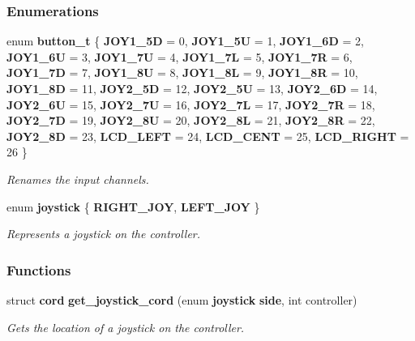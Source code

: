 \subsubsection*{Enumerations}
\begin{DoxyCompactItemize}
\item 
enum \textbf{ button\+\_\+t} \{ \newline
\textbf{ J\+O\+Y1\+\_\+5D} = 0, 
\textbf{ J\+O\+Y1\+\_\+5U} = 1, 
\textbf{ J\+O\+Y1\+\_\+6D} = 2, 
\textbf{ J\+O\+Y1\+\_\+6U} = 3, 
\newline
\textbf{ J\+O\+Y1\+\_\+7U} = 4, 
\textbf{ J\+O\+Y1\+\_\+7L} = 5, 
\textbf{ J\+O\+Y1\+\_\+7R} = 6, 
\textbf{ J\+O\+Y1\+\_\+7D} = 7, 
\newline
\textbf{ J\+O\+Y1\+\_\+8U} = 8, 
\textbf{ J\+O\+Y1\+\_\+8L} = 9, 
\textbf{ J\+O\+Y1\+\_\+8R} = 10, 
\textbf{ J\+O\+Y1\+\_\+8D} = 11, 
\newline
\textbf{ J\+O\+Y2\+\_\+5D} = 12, 
\textbf{ J\+O\+Y2\+\_\+5U} = 13, 
\textbf{ J\+O\+Y2\+\_\+6D} = 14, 
\textbf{ J\+O\+Y2\+\_\+6U} = 15, 
\newline
\textbf{ J\+O\+Y2\+\_\+7U} = 16, 
\textbf{ J\+O\+Y2\+\_\+7L} = 17, 
\textbf{ J\+O\+Y2\+\_\+7R} = 18, 
\textbf{ J\+O\+Y2\+\_\+7D} = 19, 
\newline
\textbf{ J\+O\+Y2\+\_\+8U} = 20, 
\textbf{ J\+O\+Y2\+\_\+8L} = 21, 
\textbf{ J\+O\+Y2\+\_\+8R} = 22, 
\textbf{ J\+O\+Y2\+\_\+8D} = 23, 
\newline
\textbf{ L\+C\+D\+\_\+\+L\+E\+FT} = 24, 
\textbf{ L\+C\+D\+\_\+\+C\+E\+NT} = 25, 
\textbf{ L\+C\+D\+\_\+\+R\+I\+G\+HT} = 26
 \}\begin{DoxyCompactList}\small\item\em Renames the input channels. \end{DoxyCompactList}
\item 
enum \textbf{ joystick} \{ \textbf{ R\+I\+G\+H\+T\+\_\+\+J\+OY}, 
\textbf{ L\+E\+F\+T\+\_\+\+J\+OY}
 \}\begin{DoxyCompactList}\small\item\em Represents a joystick on the controller. \end{DoxyCompactList}
\end{DoxyCompactItemize}
\subsubsection*{Functions}
\begin{DoxyCompactItemize}
\item 
struct \textbf{ cord} \textbf{ get\+\_\+joystick\+\_\+cord} (enum \textbf{ joystick} \textbf{ side}, int controller)
\begin{DoxyCompactList}\small\item\em Gets the location of a joystick on the controller. \end{DoxyCompactList}\end{DoxyCompactItemize}


